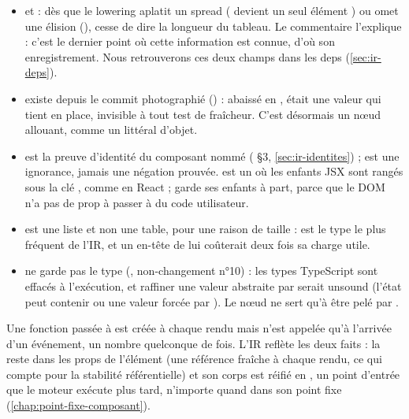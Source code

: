 \begin{itemize}
  \item {} et  : dès que le lowering aplatit un spread (\code{[...rows]} devient un seul élément ) ou omet une élision (\code{[a, , b]}),  cesse de dire la longueur du tableau. Le commentaire l'explique : c'est le dernier point où cette information est connue, d'où son enregistrement. Nous retrouverons ces deux champs dans les deps (\cref{sec:ir-deps}).
  \item {} existe depuis le commit photographié () : abaissé en ,  était une valeur qui \og tient en place\fg{}, invisible à tout test de fraîcheur. C'est désormais un nœud allouant, comme un littéral d'objet.
  \item {} est la preuve d'identité du composant nommé ( §3, \cref{sec:ir-identites}) ;  est une ignorance, jamais une négation prouvée.  est un  où les enfants JSX sont rangés sous la clé , comme en React ;  garde ses enfants à part, parce que le DOM n'a pas de prop  à passer à du code utilisateur.
  \item {} est une liste et non une table, pour une raison de taille :  est le type le plus fréquent de l'IR, et un en-tête de  lui coûterait deux fois sa charge utile.
  \item {} ne garde pas le type (, non-changement n°10) : les types TypeScript sont effacés à l'exécution, et raffiner une valeur abstraite par  serait unsound (l'état peut contenir  ou une valeur forcée par ). Le nœud ne sert qu'à être pelé par .
\end{itemize}

\begin{react}
Une fonction passée à  est créée à chaque rendu mais n'est appelée qu'à l'arrivée d'un événement, un nombre quelconque de fois. L'IR reflète les deux faits : la  reste dans les props de l'élément (une référence fraîche à chaque rendu, ce qui compte pour la stabilité référentielle) et son corps est réifié en , un point d'entrée que le moteur exécute \og plus tard, n'importe quand\fg{} dans son point fixe (\cref{chap:point-fixe-composant}).
\end{react}

